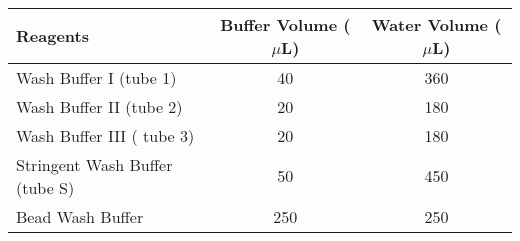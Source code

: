 \
\begin{table}[h]
	\centering
	\begin{tabularx}{0.9\textwidth}{lcc}
		\toprule
		Reagents                       & Buffer Volume ($\mu$L) & Water Volume ($\mu$L) \\ \midrule
		Wash Buffer I (tube 1)         & 40                 & 360              \\
		Wash Buffer II (tube 2)        & 20                 & 180              \\
		Wash Buffer III ( tube 3)      & 20                 & 180              \\
		Stringent Wash Buffer (tube S) & 50                 & 450              \\
		Bead Wash Buffer               & 250                & 250              \\ \bottomrule
	\end{tabularx}
\end{table}

